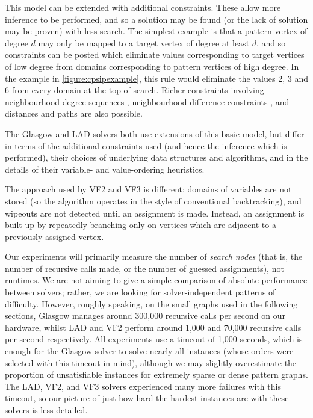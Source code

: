 \documentclass[twoside,11pt]{article}
\begin{document}
This model can be extended with additional constraints. These allow more inference to be performed,
and so a solution may be found (or the lack of solution may be proven) with less search.  The
simplest example is that a pattern vertex of degree $d$ may only be mapped to a target vertex of
degree at least $d$, and so constraints can be posted which eliminate values corresponding to target
vertices of low degree from domains corresponding to pattern vertices of high degree. In the example
in \cref{figure:cpsipexample}, this rule would eliminate the values $2$, $3$ and $6$ from every domain at
the top of search. Richer constraints involving neighbourhood degree sequences
\cite{DBLP:journals/constraints/ZampelliDS10}, neighbourhood difference constraints
\cite{DBLP:journals/ai/Solnon10}, and distances and paths
\cite{DBLP:conf/cp/AudemardLMGP14,DBLP:conf/cp/McCreeshP15,DBLP:conf/lion/KotthoffMS16} are also
possible.

The Glasgow and LAD solvers both use extensions of this basic model, but differ in terms of the
additional constraints used (and hence the inference which is performed), their choices of
underlying data structures and algorithms, and in the details of their variable- and value-ordering
heuristics.

The approach used by VF2 and VF3 is different: domains of variables are not stored (so the algorithm
operates in the style of conventional backtracking), and wipeouts are not detected until an
assignment is made. Instead, an assignment is built up by repeatedly branching only on vertices
which are adjacent to a previously-assigned vertex.

Our experiments will primarily measure the number of \emph{search nodes} (that is, the number of
recursive calls made, or the number of guessed assignments), not runtimes. We are not aiming to give
a simple comparison of absolute performance between solvers; rather, we are looking for
solver-independent patterns of difficulty. However, roughly speaking, on the small graphs used in
the following sections, Glasgow manages around 300,000 recursive calls per second on our hardware,
whilst LAD and VF2 perform around 1,000 and 70,000 recursive calls per second respectively.
All experiments use a timeout of 1,000 seconds, which is enough for the Glasgow solver to solve
nearly all instances (whose orders were selected with this timeout in mind), although we may
slightly overestimate the proportion of unsatisfiable instances for extremely sparse or dense
pattern graphs. The LAD, VF2, and VF3 solvers experienced many more failures with this timeout, so
our picture of just how hard the hardest instances are with these solvers is less detailed.
\end{document}
